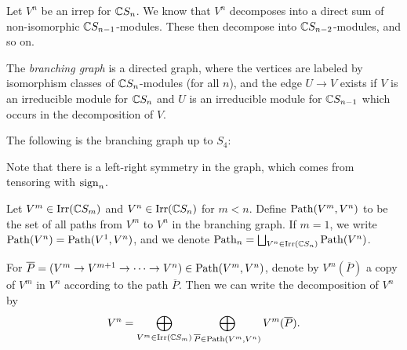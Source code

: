 \begin{remark}
  Let $V^n$ be an irrep for $\mathbb{C} S_n$.
  We know that $V^n$ decomposes into a
  direct sum of non-isomorphic
  $\mathbb{C} S_{n - 1}$-modules. These then
  decompose into $\mathbb{C} S_{n - 2}$-modules,
  and so on.
\end{remark}

\begin{definition}
  The \emph{branching graph} is a
  directed graph, where the vertices
  are labeled by isomorphism classes
  of $\mathbb{C} S_n$-modules (for all $n$), and
  the edge $U \to V$ exists if
  $V$ is an irreducible module for
  $\mathbb{C} S_n$ and $U$ is an irreducible
  module for $\mathbb{C} S_{n - 1}$ which
  occurs in the decomposition of $V$.
\end{definition}

\begin{example}
  The following is the branching
  graph up to $S_4$:
  \begin{center}
  \end{center}
  Note that there is a left-right
  symmetry in the graph, which
  comes from tensoring with $\operatorname{sign}_n$.
\end{example}

\begin{definition}
  Let $V^m \in \operatorname{Irr}(\mathbb{C} S_m)$
  and $V^n \in \operatorname{Irr}(\mathbb{C} S_n)$ for
  $m < n$. Define
  $\operatorname{Path}(V^m, V^n)$ to be the set of all
  paths from $V^m$ to $V^n$ in the
  branching graph. If $m = 1$, we write
  $\operatorname{Path}(V^n) = \operatorname{Path}(V^1, V^n)$, and
  we denote $\operatorname{Path}_n = \bigsqcup_{V^n \in \operatorname{Irr}(\mathbb{C} S_n)} \operatorname{Path}(V^n)$.
\end{definition}

\begin{remark}
  For $\overline{P} = (V^m \to V^{m + 1} \to \cdots \to V^n) \in \operatorname{Path}(V^m, V^n)$,
  denote by $V^m(\overline{P})$ a copy
  of $V^m$ in $V^n$ according to the path
  $\overline{P}$. Then we can write the
  decomposition of $V^n$ by
  \[
    V^n = \bigoplus_{V^m \in \operatorname{Irr}(\mathbb{C} S_m)}
    \bigoplus_{\overline{P} \in \operatorname{Path}(V^m, V^n)}
    V^m(\overline{P}).
  \]
\end{remark}


